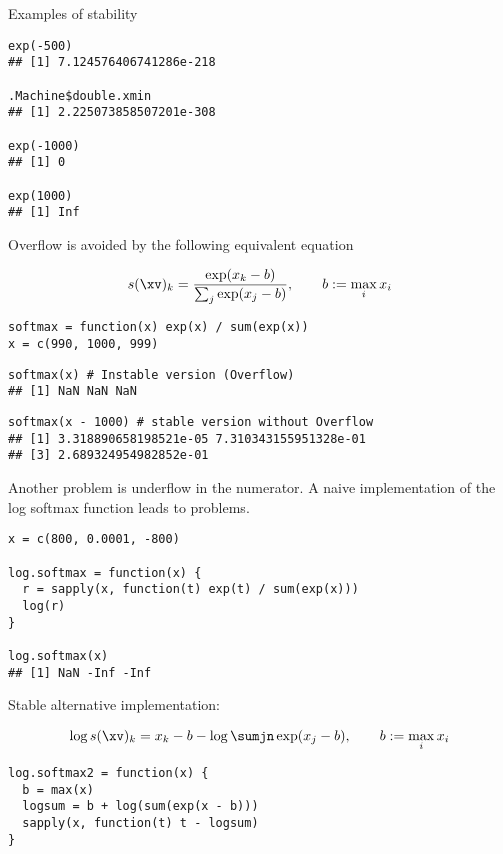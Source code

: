 \documentclass[11pt,compress,t,notes=noshow, xcolor=table]{beamer}
\begin{document}
\begin{vbframe}{Examples of stability}
\begin{verbatim}
exp(-500)
## [1] 7.124576406741286e-218

.Machine$double.xmin
## [1] 2.225073858507201e-308

exp(-1000)
## [1] 0

exp(1000)
## [1] Inf
\end{verbatim}

\normalsize

\framebreak
Overflow is avoided by the following equivalent equation

$$
s(\xv)_k = \frac{\exp(x_k - b)}{\sum_j \exp(x_j - b)}, \qquad b := \max_i x_i
$$

\lz
\footnotesize
\begin{verbatim}
softmax = function(x) exp(x) / sum(exp(x))
x = c(990, 1000, 999)
\end{verbatim}

\vspace{0.1cm}

\begin{verbatim}
softmax(x) # Instable version (Overflow)
## [1] NaN NaN NaN
\end{verbatim}

\vspace{0.1cm}

\begin{verbatim}
softmax(x - 1000) # stable version without Overflow
## [1] 3.318890658198521e-05 7.310343155951328e-01
## [3] 2.689324954982852e-01
\end{verbatim}

\normalsize

\framebreak

Another problem is underflow in the numerator. A naive implementation of the log softmax function leads to problems.
\lz
\lz
\footnotesize
\begin{verbatim}
x = c(800, 0.0001, -800)

log.softmax = function(x) {
  r = sapply(x, function(t) exp(t) / sum(exp(x)))
  log(r)
}

log.softmax(x)
## [1] NaN -Inf -Inf
\end{verbatim}

\normalsize
\framebreak
Stable alternative implementation:

$$
\log s(\xv)_k = x_k - b - \log \sumjn \exp(x_j - b), \qquad b := \max_i x_i
$$
\lz
\footnotesize
\begin{verbatim}
log.softmax2 = function(x) {
  b = max(x)
  logsum = b + log(sum(exp(x - b)))
  sapply(x, function(t) t - logsum)
}


\end{verbatim}
\end{vbframe}
\end{document}
